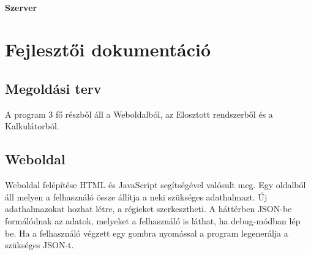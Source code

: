 \documentclass{elteikthesis}
\begin{document}
\subsubsection{Szerver}

\chapter{Fejlesztői dokumentáció}
\begin{comment}
A Fejlesztői dokumentáció tartalmazza
- a probléma részletes specifikációját,
- a felhasznált módszerek részletes leírását, a használt fogalmak definícióját,
- a program logikai és fizikai szerkezetének leírását (adatszerkezetek, adatbázisok,
modulfelbontás),
- a tesztelési tervet és a tesztelés eredményeit.
\end{comment}

\section{Megoldási terv}
A program 3 fő részből áll a Weboldalból, az Elosztott rendszerből és a Kalkulátorból.

\section{Weboldal}
Weboldal felépítése HTML és JavaScript segítségével valósult meg. Egy oldalból áll melyen a felhasználó össze állítja a neki szükséges adathalmazt. Új adathalmazokat hozhat létre, a régieket szerkesztheti. A háttérben JSON-be formálódnak az adatok, melyeket a felhasználó is láthat, ha debug-módban lép be. 
Ha a felhasználó végzett egy gombra nyomással a program legenerálja a szükséges JSON-t.
\end{document}
